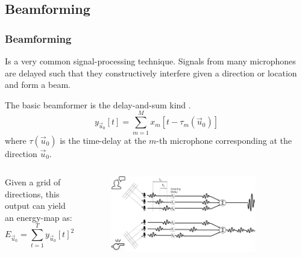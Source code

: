\documentclass{beamer}
\begin{document}
\begin{frame}
\begin{columns}
\end{columns}

\end{frame}

\subsection{Beamforming}

\begin{frame}
\frametitle{Beamforming}

Is a very common signal-processing technique. Signals from many microphones are delayed such that they constructively interfere given a direction or location and form a beam.

The basic beamformer is the delay-and-sum kind \cite{argentieri_survey_2015}.
\begin{equation}
y_{\vec{u}_0}[t] = \sum_{m=1}^M x_m[t-\tau_m(\vec{u}_0)] 
\end{equation}
\tiny{where $\tau(\vec{u}_0)$ is the time-delay at the $m$-th microphone corresponding at the direction $\vec{u}_0$.}\\\small

\begin{columns}

Given a grid of directions, this output can yield an energy-map as:
\begin{equation}
E_{\vec{u}_0} = \sum_{t=1}^T y_{\vec{u}_0}[t]^2
\end{equation}

\begin{figure}[H]
\includegraphics[width=0.9\textwidth]{./rascon_2017/delay_and_sum.jpg}
\centering
\end{figure}
\cite{rascon_localization_2017}

\end{columns}

\end{frame}
\end{document}
